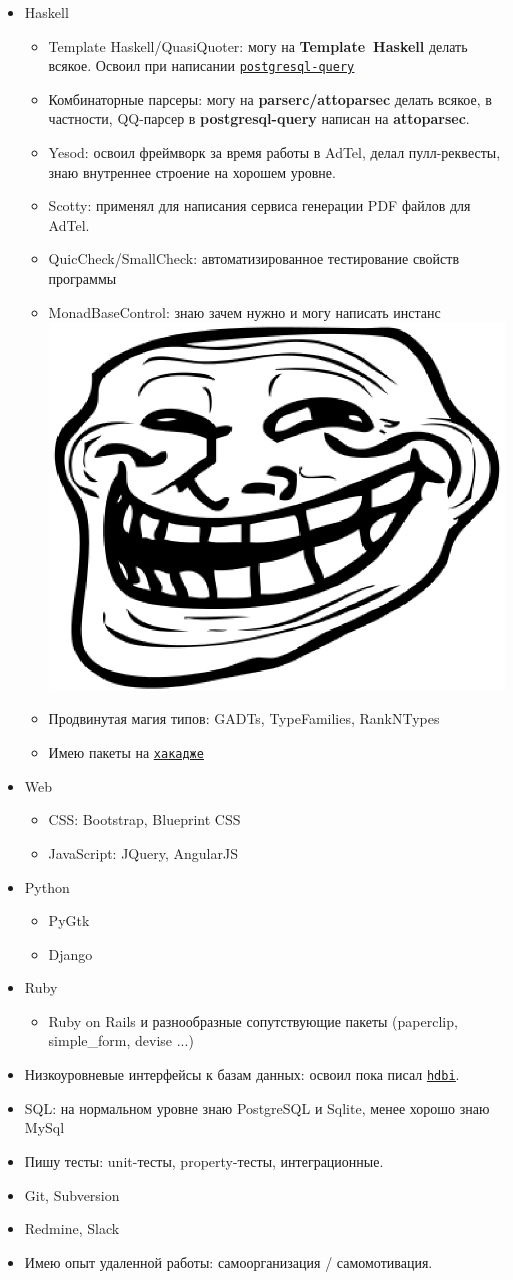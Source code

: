 \documentclass[11pt,a4paper,sans]{moderncv}        %
\newcommand*{\nlink}[2]{\textcolor{blue}{\texttt{\underline{\href{#1}{#2}}}}}
\newcommand*{\bb}[1]{\textbf{\hbox{#1}}}
\begin{document}
\begin{itemize}
\item Haskell
  \begin{itemize}
  \item Template Haskell/QuasiQuoter: могу на \bb{Template Haskell}
    делать всякое. Освоил при написании
    \nlink{http://hackage.haskell.org/package/postgresql-query}{postgresql-query}
  \item Комбинаторные парсеры: могу на \bb{parserc/attoparsec} делать
    всякое, в частности, QQ-парсер в \bb{postgresql-query} написан на
    \bb{attoparsec}.
  \item Yesod: освоил фреймворк за время работы в AdTel, делал
    пулл-реквесты, знаю внутреннее строение на хорошем уровне.
  \item Scotty: применял для написания сервиса генерации PDF файлов для AdTel.
  \item QuicCheck/SmallCheck: автоматизированное тестирование свойств
    программы
  \item MonadBaseControl: знаю зачем нужно и могу написать инстанс \includegraphics[height=1ex]{Trollface.ps}
  \item Продвинутая магия типов: GADTs, TypeFamilies, RankNTypes
  \item Имею пакеты на \nlink{http://hackage.haskell.org/user/AlekseyUymanov}{хакадже}
  \end{itemize}
\item Web
  \begin{itemize}
  \item CSS: Bootstrap, Blueprint CSS
  \item JavaScript: JQuery, AngularJS
  \end{itemize}
\item Python
  \begin{itemize}
  \item PyGtk
  \item Django
  \end{itemize}
\item Ruby
  \begin{itemize}
  \item Ruby on Rails и разнообразные сопутствующие пакеты (paperclip, simple\_form, devise ...)
  \end{itemize}
\item Низкоуровневые интерфейсы к базам данных: освоил пока писал
  \nlink{http://hackage.haskell.org/package/hdbi}{hdbi}.
\item SQL: на нормальном уровне знаю PostgreSQL и Sqlite, менее хорошо
  знаю MySql
\item Пишу тесты: unit-тесты, property-тесты, интеграционные.
\item Git, Subversion
\item Redmine, Slack
\item Имею опыт удаленной работы: самоорганизация / самомотивация.
\end{itemize}
\end{document}
